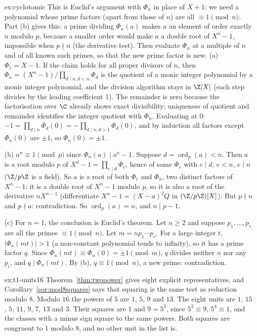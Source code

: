 \begin{solution}{ex:cyclotomic}
\idea This is Euclid's argument with $\Phi_n$ in place of $X+1$: we need a polynomial whose prime factors (apart from those of $n$) are all $\equiv1\pmod n$. Part (b) gives this: a prime dividing $\Phi_n(a)$ makes $a$ an element of order exactly $n$ modulo $p$, because a smaller order would make $a$ a double root of $X^n-1$, impossible when $p\nmid n$ (the derivative test). Then evaluate $\Phi_n$ at a multiple of $n$ and of all known such primes, so that the new prime factor is new.
\writeup (a) $\Phi_1=X-1$. If the claim holds for all proper divisors of $n$, then $\Phi_n=(X^n-1)/\prod_{d\mid n,d<n}\Phi_d$ is the quotient of a monic integer polynomial by a monic integer polynomial, and the division algorithm stays in $\Z[X]$ (each step divides by the leading coefficient $1$). The remainder is zero because the factorisation over $\C$ already shows exact divisibility; uniqueness of quotient and remainder identifies the integer quotient with $\Phi_n$. Evaluating at $0$: $-1=\prod_{d\mid n}\Phi_d(0)=-\prod_{d\mid n,d>1}\Phi_d(0)$, and by induction all factors except $\Phi_n(0)$ are $\pm1$, so $\Phi_n(0)=\pm1$.

(b) $a^n\equiv1\pmod p$ since $\Phi_n(a)\mid a^n-1$. Suppose $d=\operatorname{ord}_p(a)<n$. Then $a$ is a root modulo $p$ of $X^d-1=\prod_{e\mid d}\Phi_e$, hence of some $\Phi_e$ with $e\mid d$, $e<n$, $e\mid n$ ($\Z/p\Z$ is a field). So $a$ is a root of both $\Phi_e$ and $\Phi_n$, two distinct factors of $X^n-1$: it is a double root of $X^n-1$ modulo $p$, so it is also a root of the derivative $nX^{n-1}$ (differentiate $X^n-1=(X-a)^2Q$ in $(\Z/p\Z)[X]$). But $p\nmid n$ and $p\nmid a$: contradiction. So $\operatorname{ord}_p(a)=n$, and $n\mid p-1$.

(c) For $n=1$, the conclusion is Euclid's theorem. Let $n\ge2$ and suppose $p_1,\dots,p_r$ are all the primes $\equiv1\pmod n$. Let $m=np_1\cdots p_r$. For a large integer $t$, $|\Phi_n(mt)|>1$ (a non-constant polynomial tends to infinity), so it has a prime factor $q$. Since $\Phi_n(mt)\equiv\Phi_n(0)=\pm1\pmod m$, $q$ divides neither $n$ nor any $p_i$, and $q\mid\Phi_n(mt)$. By (b), $q\equiv1\pmod n$, a new prime: contradiction.
\end{solution}

\begin{solution}{ex:t1-units16}
\idea Theorem~\ref{thm:twopower} gives eight explicit representatives, and Corollary~\ref{cor:mod8squares} says that squaring is the same test as reduction modulo $8$.
\writeup Modulo $16$ the powers of $5$ are $1$, $5$, $9$ and $13$.
The eight units are $1$, $15$, $5$, $11$, $9$, $7$, $13$ and $3$.
Their squares are $1$ and $9=5^2$, since $5^2\equiv9$, $5^4\equiv1$, and the classes with a minus sign square to the same powers. Both squares are congruent to $1$ modulo $8$, and no other unit in the list is.
\end{solution}

